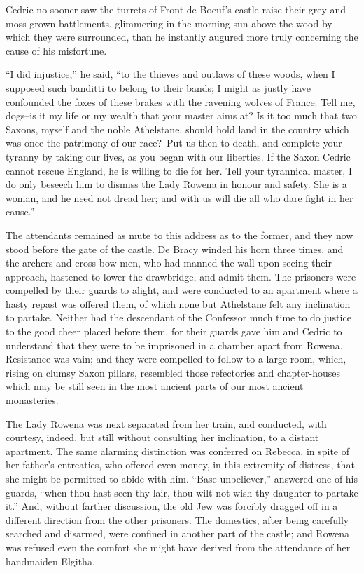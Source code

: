 Cedric no sooner saw the turrets of Front-de-Boeuf's castle raise their
grey and moss-grown battlements, glimmering in the morning sun above the
wood by which they were surrounded, than he instantly augured more truly
concerning the cause of his misfortune.

``I did injustice,'' he said, ``to the thieves and outlaws of these
woods, when I supposed such banditti to belong to their bands; I might
as justly have confounded the foxes of these brakes with the ravening
wolves of France. Tell me, dogs--is it my life or my wealth that your
master aims at? Is it too much that two Saxons, myself and the noble
Athelstane, should hold land in the country which was once the patrimony
of our race?--Put us then to death, and complete your tyranny by taking
our lives, as you began with our liberties. If the Saxon Cedric cannot
rescue England, he is willing to die for her. Tell your tyrannical
master, I do only beseech him to dismiss the Lady Rowena in honour and
safety. She is a woman, and he need not dread her; and with us will die
all who dare fight in her cause.''

The attendants remained as mute to this address as to the former, and
they now stood before the gate of the castle. De Bracy winded his horn
three times, and the archers and cross-bow men, who had manned the wall
upon seeing their approach, hastened to lower the drawbridge, and admit
them. The prisoners were compelled by their guards to alight, and were
conducted to an apartment where a hasty repast was offered them, of
which none but Athelstane felt any inclination to partake. Neither had
the descendant of the Confessor much time to do justice to the good
cheer placed before them, for their guards gave him and Cedric to
understand that they were to be imprisoned in a chamber apart from
Rowena. Resistance was vain; and they were compelled to follow to a
large room, which, rising on clumsy Saxon pillars, resembled those
refectories and chapter-houses which may be still seen in the most
ancient parts of our most ancient monasteries.

The Lady Rowena was next separated from her train, and conducted, with
courtesy, indeed, but still without consulting her inclination, to a
distant apartment. The same alarming distinction was conferred on
Rebecca, in spite of her father's entreaties, who offered even money, in
this extremity of distress, that she might be permitted to abide with
him. ``Base unbeliever,'' answered one of his guards, ``when thou hast
seen thy lair, thou wilt not wish thy daughter to partake it.'' And,
without farther discussion, the old Jew was forcibly dragged off in a
different direction from the other prisoners. The domestics, after being
carefully searched and disarmed, were confined in another part of the
castle; and Rowena was refused even the comfort she might have derived
from the attendance of her handmaiden Elgitha.

